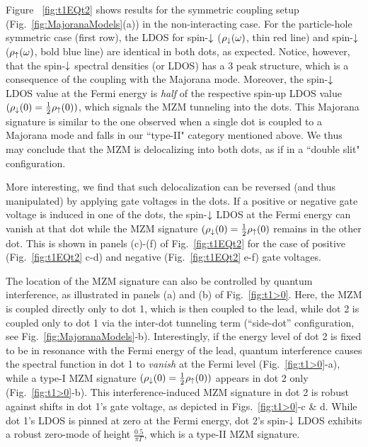\documentclass[showpacs,aps,prb,reprint,superscriptaddress]{revtex4-1}
\begin{document}
    
     Figure \ \ref{fig:t1EQt2} shows results for the symmetric coupling setup (Fig.\ \ref{fig:MajoranaModels}(a)) in the non-interacting case. For the particle-hole symmetric case (first row), the LDOS for spin-$\downarrow$ ($\rho_\downarrow(\omega)$, thin red line) and spin-$\downarrow$ ($\rho_\uparrow(\omega)$, bold blue line) are identical in both dots, as expected. Notice, however, that the  spin-$\downarrow$ spectral densities (or LDOS) has a 3 peak structure, which is a consequence of the coupling with the Majorana mode. Moreover, the spin-$\downarrow$ LDOS value at the Fermi energy is \textit{half} of the respective spin-up LDOS value $(\rho_\downarrow(0) = \frac{1}{2}\rho_\uparrow(0))$, which signals the MZM tunneling into the dots. This Majorana signature is similar to the one observed when a single dot is coupled to a Majorana mode \cite{liu_detecting_2011,vernek_subtle_2014} and falls in our ``type-II" category mentioned above.  We thus may conclude that the MZM is delocalizing into both dots, as if in a ``double slit" configuration. 

More interesting, we find that such delocalization can be reversed (and thus manipulated) by applying gate voltages in the dots. If a positive or negative gate voltage is induced in one of the dots, the spin-$\downarrow$ LDOS at the Fermi energy can vanish at that dot while the MZM signature $(\rho_\downarrow(0) = \frac{1}{2}\rho_\uparrow(0)$ remains in the other dot. This is shown in panels (c)-(f) of Fig.\ \ref{fig:t1EQt2} for the case of positive (Fig.\ \ref{fig:t1EQt2} c-d) and negative (Fig.\ \ref{fig:t1EQt2} e-f) gate voltages. 
%


    The location of the MZM signature can also be controlled by quantum interference, as illustrated in panels (a) and (b) of Fig.\ \ref{fig:t1>0}. Here, the MZM is coupled directly only to dot 1, which is then coupled to the lead, while dot 2 is coupled only to dot 1 via the inter-dot tunneling term (``side-dot'' configuration, see Fig.\ \ref{fig:MajoranaModels}-b). Interestingly, if the energy level of dot 2 is fixed to be in resonance with the Fermi energy of the lead, quantum interference causes the spectral function in dot 1 to \textit{vanish} at the Fermi level (Fig.\ \ref{fig:t1>0}-a), while a type-I MZM signature $(\rho_\downarrow(0) = \frac{1}{2}\rho_\uparrow(0))$ appears in dot 2 only (Fig.\ \ref{fig:t1>0}-b). This interference-induced MZM signature in dot 2 is robust against shifts in dot 1's gate voltage, as depicted in Figs.\ \ref{fig:t1>0}-c \& d.  While dot 1's LDOS is pinned at zero at the Fermi energy, dot 2's spin-$\downarrow$ LDOS exhibits a robust zero-mode of height $\frac{0.5}{\pi \Gamma}$, which is a type-II MZM signature. 
\end{document}
